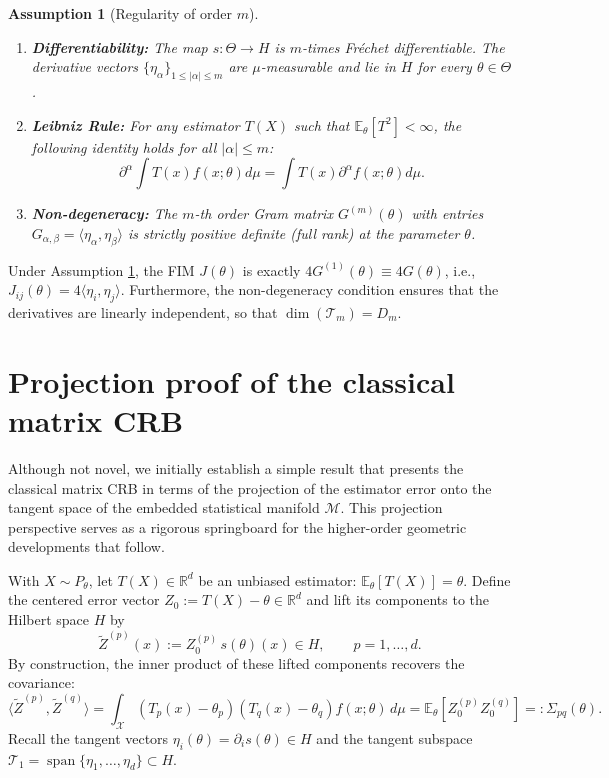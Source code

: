 \documentclass[pdflatex,sn-mathphys-num]{sn-jnl}%
\newcommand{\ip}[2]{\langle #1,#2\rangle}
\theoremstyle{thmstyleone}%
\theoremstyle{thmstyletwo}%
\theoremstyle{thmstylethree}%
\newtheorem{assumption}[theorem]{Assumption}
\begin{document}
\begin{assumption}[Regularity of order $m$]
\label{assump:smooth}
\begin{enumerate}[\rm (i)]

\item \textbf{Differentiability:} The map $s: \Theta \to H$ is $m$-times Fr\'echet differentiable. The derivative vectors $\{\eta_\alpha\}_{1 \le |\alpha| \le m}$ are $\mu$-measurable and lie in $H$ for every $\theta \in \Theta$.
\item \textbf{Leibniz Rule:} For any estimator $T(X)$ such that $\mathbb{E}_\theta[T^2] < \infty$, the following identity holds for all $|\alpha| \le m$:
\[
\partial^\alpha \int T(x) f(x;\theta) d\mu = \int T(x) \partial^\alpha f(x;\theta) d\mu.
\]
\item \textbf{Non-degeneracy:} The $m$-th order Gram matrix $G^{(m)}(\theta)$ with entries $G_{\alpha, \beta} = \ip{\eta_\alpha}{\eta_\beta}$ is strictly positive definite (full rank) at the parameter $\theta$.
\end{enumerate}
\end{assumption}

Under Assumption \ref{assump:smooth}, the FIM $J(\theta)$ is exactly $4G^{(1)}(\theta)\equiv 4G(\theta)$, i.e., $J_{ij}(\theta) = 4\ip{\eta_i}{\eta_j}$. Furthermore, the non-degeneracy condition ensures that the derivatives are linearly independent, so that $\dim(\mathcal{T}_m) = D_m$.

\section{Projection proof of the classical matrix CRB}\label{sec:CRB}

Although not novel, we initially establish a simple result that presents the classical matrix CRB in terms of the projection of the estimator error onto the tangent space of the embedded statistical manifold $\mathcal{M}$. This projection perspective serves as a rigorous springboard for the higher-order geometric developments that follow.

With \(X\sim P_\theta\), let \(T(X)\in\mathbb{R}^d\) be an unbiased estimator: \(\mathbb{E}_\theta[T(X)]=\theta\).
Define the centered error vector \(Z_0 := T(X)-\theta\in\mathbb{R}^d\) and lift its components to the Hilbert space \(H\) by
\[
\widetilde Z^{(p)}(x) := Z_0^{(p)}\, s(\theta)(x)\in H,\qquad p=1,\dots,d.
\]
By construction, the inner product of these lifted components recovers the covariance:
\[
\langle\widetilde Z^{(p)},\widetilde Z^{(q)}\rangle = \int_{\mathcal{X}} (T_p(x)-\theta_p)(T_q(x)-\theta_q) f(x;\theta) \, d\mu = \mathbb{E}_\theta[Z_0^{(p)} Z_0^{(q)}] =: \Sigma_{pq}(\theta).
\]
Recall the tangent vectors \(\eta_i(\theta)=\partial_i s(\theta)\in H\) and the tangent subspace \(\mathcal{T}_1 = \operatorname{span}\{\eta_1,\dots,\eta_d\} \subset H\).
\end{document}

